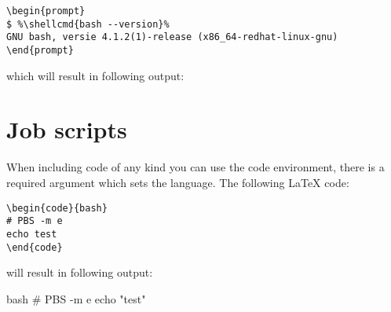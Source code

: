 \documentclass[11pt,a4paper,oneside]{book}
\newcommand{\shellcmd}[1]{\textbf{\texttt{\footnotesize #1}\\}}
\begin{document}
\begin{verbatim}
\begin{prompt}
$ %\shellcmd{bash --version}%
GNU bash, versie 4.1.2(1)-release (x86_64-redhat-linux-gnu)
\end{prompt}
\end{verbatim}

which will result in following output:

\section{Job scripts}
\label{sec:job-scripts}

When including code of any kind you can use the code environment, there is a
required argument which sets the language. The following LaTeX code:

\begin{verbatim}
\begin{code}{bash}
# PBS -m e
echo test
\end{code}
\end{verbatim}

will result in following output:

\begin{code}{bash}
# PBS -m e
echo "test"
\end{code}
\end{document}
